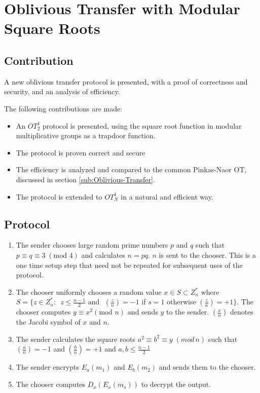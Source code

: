 \chapter{Oblivious Transfer with Modular Square Roots}\label{sec:OT-SquareRoots}
\label{chapter:otquad}


\section{Contribution}

A new oblivious transfer protocol is presented, with a proof of correctness
and security, and an analysis of efficiency. 

The following contributions are made:
\begin{itemize}
\item An $OT_{2}^{1}$ protocol is presented, using the square root function
in modular multiplicative groups as a trapdoor function.
\item The protocol is proven correct and secure
\item The efficiency is analyzed and compared to the common Pinkas-Naor
OT, discussed in section \ref{sub:Oblivious-Transfer}.
\item The protocol is extended to $OT_{N}^{1}$ in a natural and efficient
way.
\end{itemize}

\section{Protocol}
\begin{enumerate}
\item The sender chooses large random prime numbers $p$ and $q$ such that
$p\equiv q\equiv3\;(\mbox{mod }4)$ and calculates $n=pq$. $n$ is
sent to the chooser. This is a one time setup step that need not be
repeated for subsequent uses of the protocol. 
\item The chooser uniformly chooses a random value $x\in S\subset Z_{n}^{*}$
where $S=\{z\in Z_{n}^{*}:$~$z\le\frac{n-1}{2}\mbox{ and }$ $\left(\frac{z}{n}\right)=-1$
if $s=1$ otherwise $\left(\frac{z}{n}\right)=+1\}$. The chooser
computes $y\equiv x^{2}(\mbox{mod }n)$ and sends $y$ to the sender.
$\left(\frac{x}{n}\right)$ denotes the Jacobi symbol of $x$ and
$n$. 
\item The sender calculates the square roots $a^{2}\equiv b^{2}\equiv y\;(mod\, n)$
such that $\left(\frac{a}{n}\right)=-1$ and $\left(\frac{b}{n}\right)=+1$
and $a,b\le\frac{n-1}{2}$ 
\item The sender encrypts $E_{a}(m_{1})$ and $E_{b}(m_{2})$ and sends
them to the chooser. 
\item The chooser computes $D_{x}(E_{x}(m_{s}))$ to decrypt the output. 
\end{enumerate}


